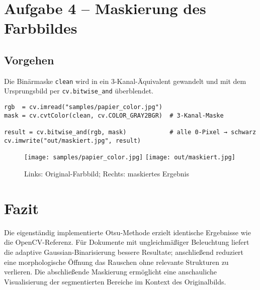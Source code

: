 \documentclass[a4paper,11pt]{article}
\begin{document}
\section{Aufgabe 4 – Maskierung des Farbbildes}
\subsection{Vorgehen}
Die Binärmaske \texttt{clean} wird in ein 3-Kanal-Äquivalent
gewandelt und mit dem Ursprungsbild per \texttt{cv.bitwise\_and}
überblendet.

\begin{lstlisting}[caption={Aufbringen der Maske auf das Farbbild}]
rgb  = cv.imread("samples/papier_color.jpg")
mask = cv.cvtColor(clean, cv.COLOR_GRAY2BGR)  # 3-Kanal-Maske

result = cv.bitwise_and(rgb, mask)            # alle 0-Pixel → schwarz
cv.imwrite("out/maskiert.jpg", result)
\end{lstlisting}

\begin{figure}[H]
  \centering
  \texttt{[image: samples/papier\_color.jpg]}
  \texttt{[image: out/maskiert.jpg]}
  \caption{Links: Original-Farbbild; Rechts: maskiertes Ergebnis}
\end{figure}

\section{Fazit}
Die eigenständig implementierte Otsu-Methode erzielt identische
Ergebnisse wie die OpenCV-Referenz.  
Für Dokumente mit ungleichmäßiger Beleuchtung liefert die adaptive
Gaussian-Binarisierung bessere Resultate; anschließend reduziert eine
morphologische Öffnung das Rauschen ohne relevante Strukturen zu verlieren.  
Die abschließende Maskierung ermöglicht eine anschauliche Visualisierung
der segmentierten Bereiche im Kontext des Originalbilds.

\end{document}
